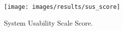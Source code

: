 
\begin{figure}[H]
	\centering
    \texttt{[image: images/results/sus\_score]}
    \caption{System Usability Scale Score.}
    \label{fig:sus_score}
\end{figure}
